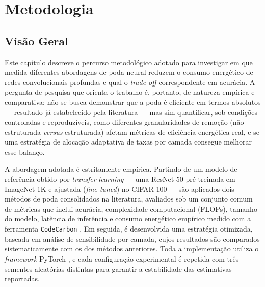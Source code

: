 
\chapter{Metodologia}\label{chap:metodologia}


\section{Visão Geral}\label{sec:visao_geral}

Este capítulo descreve o percurso metodológico adotado para investigar em que medida diferentes abordagens de poda neural reduzem o consumo energético de redes convolucionais profundas e qual o \textit{trade-off} correspondente em acurácia. A pergunta de pesquisa que orienta o trabalho é, portanto, de natureza empírica e comparativa: não se busca demonstrar que a poda é eficiente em termos absolutos --- resultado já estabelecido pela literatura \cite{Han2015, Li2017, Blalock2020} --- mas sim quantificar, sob condições controladas e reproduzíveis, como diferentes granularidades de remoção (não estruturada \textit{versus} estruturada) afetam métricas de eficiência energética real, e se uma estratégia de alocação adaptativa de taxas por camada consegue melhorar esse balanço.

A abordagem adotada é estritamente empírica. Partindo de um modelo de referência obtido por \textit{transfer learning} --- uma ResNet-50 pré-treinada em ImageNet-1K e ajustada (\textit{fine-tuned}) no CIFAR-100 --- são aplicados dois métodos de poda consolidados na literatura, avaliados sob um conjunto comum de métricas que inclui acurácia, complexidade computacional (FLOPs), tamanho do modelo, latência de inferência e consumo energético empírico medido com a ferramenta \texttt{CodeCarbon} \cite{CodeCarbon2023}. Em seguida, é desenvolvida uma estratégia otimizada, baseada em análise de sensibilidade por camada, cujos resultados são comparados sistematicamente com os dos métodos anteriores. Toda a implementação utiliza o \textit{framework} PyTorch \cite{Paszke2019}, e cada configuração experimental é repetida com três sementes aleatórias distintas para garantir a estabilidade das estimativas reportadas.

